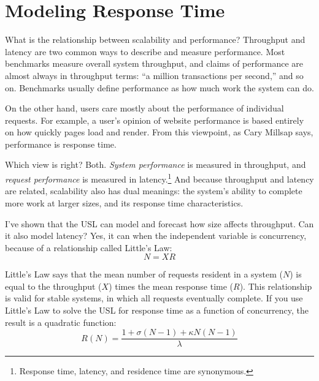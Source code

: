 \documentclass{vivid_layout}
\begin{document}
\section{Modeling Response Time}

What is the relationship between scalability and performance?  Throughput and
latency are two common ways to describe and measure performance. Most benchmarks
measure overall system throughput, and claims of performance are almost always
in throughput terms: ``a million transactions per second,'' and so on.
Benchmarks usually define performance as how much work the system can do.

On the other hand, users care mostly about the performance of individual
requests. For example, a user's opinion of website performance is based entirely
on how quickly pages load and render.  From this viewpoint, as Cary Millsap
says, performance is response time.

Which view is right? Both. {\itshape System performance} is measured in
throughput, and {\itshape request performance} is measured in
latency.\footnote{Response time, latency, and residence time are synonymous.}
And because throughput and latency are related, scalability also has dual
meanings: the system's ability to complete more work at larger sizes, and its
response time characteristics.

I've shown that the USL can model and forecast how size affects throughput. Can
it also model latency? Yes, it can when the independent variable is concurrency,
because of a relationship called Little's Law:
\begin{equation}
N = X R
\label{littles_law}
\end{equation}

Little's Law says that the mean number of requests resident in a system ($N$) is
equal to the throughput ($X$) times the mean response time ($R$). This
relationship is valid for stable systems, in which all requests eventually
complete.  If you use Little's Law to solve the USL for response time as a
function of concurrency, the result is a quadratic function:
\begin{equation}
R(N)=\frac{1+\sigma(N-1)+\kappa N(N-1)}{\lambda}
\label{r_n}
\end{equation}
\end{document}
